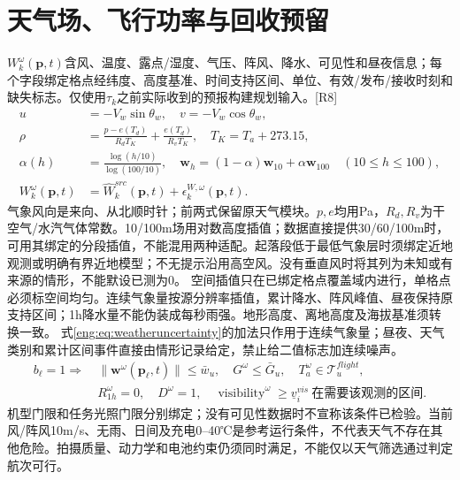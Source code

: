 \section{天气场、飞行功率与回收预留}
\noindent $W_k^\omega(\mathbf p,t)$含风、温度、露点/湿度、气压、阵风、降水、可见性和昼夜信息；每个字段绑定格点经纬度、高度基准、时间支持区间、单位、有效/发布/接收时刻和缺失标志。仅使用$\tau_k$之前实际收到的预报构建规划输入。[R8]
\begin{align}
 u&=-V_w\sin\theta_w,\quad v=-V_w\cos\theta_w,\\
 \rho&=\frac{p-e(T_d)}{R_dT_K}+\frac{e(T_d)}{R_vT_K},\quad
 T_K=T_a+273.15,\label{eng:eq:weatherconversion}\\
 \alpha(h)&=\frac{\log(h/10)}{\log(100/10)},\quad
 \mathbf w_h=(1-\alpha)\mathbf w_{10}+\alpha\mathbf w_{100}\quad(10\le h\le100),
 \label{eng:eq:weatherheight}\\
 W_k^\omega(\mathbf p,t)&=\widehat W_{k}^{src}(\mathbf p,t)
                        +\epsilon_{k}^{W,\omega}(\mathbf p,t).
 \label{eng:eq:weatheruncertainty}
\end{align}
\noindent 气象风向是来向、从北顺时针；前两式保留原天气模块。$p,e$均用Pa，$R_d,R_v$为干空气/水汽气体常数。10/100m场用对数高度插值；数据直接提供30/60/100m时，可用其绑定的分段插值，不能混用两种适配。起落段低于最低气象层时须绑定近地观测或明确有界近地模型；不无提示沿用高空风。没有垂直风时将其列为未知或有来源的情形，不能默设已测为0。
\noindent 空间插值只在已绑定格点覆盖域内进行，单格点必须标空间均匀。连续气象量按源分辨率插值，累计降水、阵风峰值、昼夜保持原支持区间；1h降水量不能伪装成每秒雨强。地形高度、离地高度及海拔基准须转换一致。
\noindent 式\eqref{eng:eq:weatheruncertainty}的加法只作用于连续气象量；昼夜、天气类别和累计区间事件直接由情形记录给定，禁止给二值标志加连续噪声。
\begin{align}
 b_\ell=1\Rightarrow\ &\|\mathbf w^\omega(\mathbf p_\ell,t)\|\le\bar w_u,
 \quad G^\omega\le\bar G_u,\quad T_a^\omega\in\mathcal T_u^{flight},\\
 &R_{1h}^\omega=0,\quad D^\omega=1,\quad
 \operatorname{visibility}^\omega\ge\underline v^{vis}_i
       \ \text{在需要该观测的区间}.
 \label{eng:eq:weatherwindow}
\end{align}
\noindent 机型门限和任务光照门限分别绑定；没有可见性数据时不宣称该条件已检验。当前风/阵风10m/s、无雨、日间及充电0--40℃是参考运行条件，不代表天气不存在其他危险。拍摄质量、动力学和电池约束仍须同时满足，不能仅以天气筛选通过判定航次可行。
\clearpage

